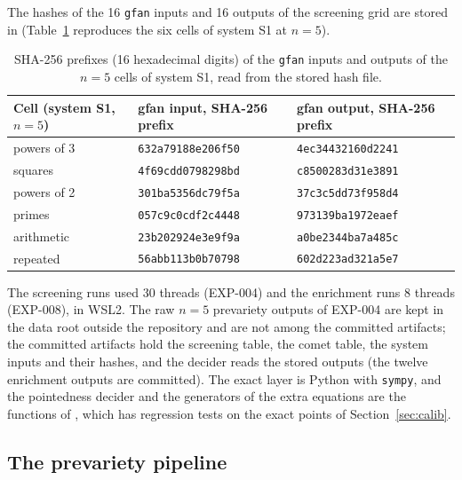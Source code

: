 \documentclass[11pt]{article}
\theoremstyle{definition}
\theoremstyle{remark}
\begin{document}
The hashes of the 16 \texttt{gfan} inputs and 16 outputs of the screening grid are stored in
(Table~\ref{tab:hashes} reproduces the six cells of system S1 at $n=5$).

\begin{table}[t]\centering\footnotesize
\begin{tabular}{@{}lll@{}}
\toprule
Cell (system S1, $n=5$) & gfan input, SHA-256 prefix & gfan output, SHA-256 prefix \\
\midrule
powers of 3 & \texttt{632a79188e206f50} & \texttt{4ec34432160d2241} \\
squares & \texttt{4f69cdd0798298bd} & \texttt{c8500283d31e3891} \\
powers of 2 & \texttt{301ba5356dc79f5a} & \texttt{37c3c5dd73f958d4} \\
primes & \texttt{057c9c0cdf2c4448} & \texttt{973139ba1972eaef} \\
arithmetic & \texttt{23b202924e3e9f9a} & \texttt{a0be2344ba7a485c} \\
repeated & \texttt{56abb113b0b70798} & \texttt{602d223ad321a5e7} \\
\bottomrule
\end{tabular}
\caption{SHA-256 prefixes (16 hexadecimal digits) of the \texttt{gfan} inputs and outputs of the
$n=5$ cells of system S1, read from the stored hash file.}\label{tab:hashes}
\end{table}

The screening runs used 30 threads (EXP-004) and the enrichment runs 8 threads (EXP-008), in WSL2. The raw $n=5$ prevariety outputs of
EXP-004 are kept in the data root outside the repository and are not among the committed artifacts; the committed artifacts hold the screening
table, the comet table, the system inputs and their hashes, and the decider reads the stored outputs (the twelve enrichment outputs are committed).
The exact layer is Python with \texttt{sympy}, and the pointedness decider and the generators of the extra equations are the functions of
, which has regression tests on the exact points of Section~\ref{sec:calib}.


\subsection{The prevariety pipeline}
\end{document}
